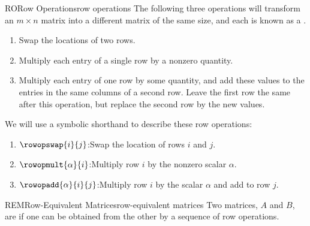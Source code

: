 \begin{definition}{RO}{Row Operations}{row operations}
The following three operations will transform an $m\times n$ matrix into a different matrix of the same size, and each is known as a .
%
\begin{enumerate}
\item Swap the locations of two rows.
\item Multiply each entry of a single row by a nonzero quantity.
\item Multiply each entry of one row by some quantity, and add these values to the entries in the same columns of a second row.  Leave the first row the same after this operation, but replace the second row by the new values.
\end{enumerate}
We will use a symbolic shorthand to describe these row operations:
\begin{enumerate}
\item $\rowopswap{i}{j}$:\quad Swap the location of rows $i$ and $j$.
\item $\rowopmult{\alpha}{i}$:\quad Multiply row $i$ by the nonzero scalar $\alpha$.
\item $\rowopadd{\alpha}{i}{j}$:\quad Multiply row $i$ by the scalar $\alpha$ and add to row $j$.
\end{enumerate}
\end{definition}
%
\begin{definition}{REM}{Row-Equivalent Matrices}{row-equivalent matrices}
Two matrices, $A$ and $B$, are  if one can be obtained from the other by a sequence of row operations.
\end{definition}
%
